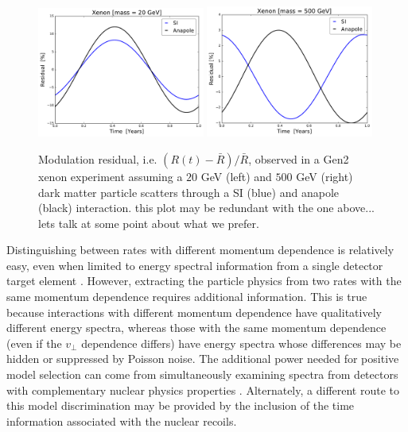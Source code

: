 \documentclass[11pt]{article}
\newcommand{\sjwColor}{red}
\newcommand{\sjw}[1]{{\color{\sjwColor} #1}}
\begin{document}
\begin{figure}
\centering
\includegraphics[width=0.49\textwidth]{plots/Xenon_SIvsAnapole_20GeV_Residual_Theory.pdf}
\includegraphics[width=0.49\textwidth]{plots/Xenon_SIvsAnapole_500GeV_Residual_Theory.pdf}
\caption{\label{fig:xenon_residual}
Modulation residual, i.e. $(R(t) - \bar{R})/\bar{R}$, observed in a Gen2 xenon experiment assuming a $20$ GeV (left) and $500$ GeV (right) dark matter particle scatters through a SI (blue) and anapole (black) interaction. \sjw{this plot may be redundant with the one above... lets talk at some point about what we prefer.}}
\end{figure}

Distinguishing between rates with different momentum dependence is relatively easy, even when limited to energy spectral information from a single detector target element \cite{Gluscevic:2015sqa}. However, extracting the particle physics from two rates with the same momentum dependence requires additional information. This is true because interactions with different momentum dependence have qualitatively different energy spectra, whereas those with the same momentum dependence (even if the $v_\perp$ dependence differs) have energy spectra whose differences may be hidden or suppressed by Poisson noise. The additional power needed for positive model selection can come from simultaneously examining spectra from detectors with complementary nuclear physics properties \cite{Gluscevic:2015sqa}. Alternately, a different route to this model discrimination may be provided by the inclusion of the time information associated with the nuclear recoils.
\end{document}
